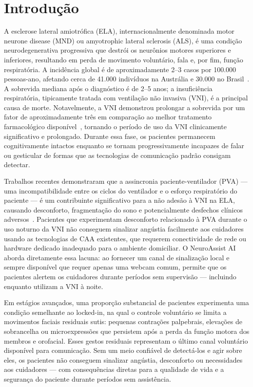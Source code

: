
\section{Introdução}
\label{sec:introducao}

A esclerose lateral amiotrófica (ELA), internacionalmente denominada motor neurone disease
(MND) ou amyotrophic lateral sclerosis (ALS), é uma condição neurodegenerativa progressiva que destrói os neurônios motores
superiores e inferiores, resultando em perda de movimento voluntário, fala e, por fim,
função respiratória. A incidência global é de aproximadamente 2--3 casos por
100.000 pessoas-ano, afetando cerca de 41.000 indivíduos na Austrália e 30.000 no
Brasil~\cite{mehta2018mnd}. A sobrevida mediana após o diagnóstico é de 2--5 anos; a
insuficiência respiratória, tipicamente tratada com ventilação não invasiva (VNI), é
a principal causa de morte. Notavelmente, a VNI demonstrou prolongar a sobrevida por
um fator de aproximadamente três em comparação ao melhor tratamento farmacológico
disponível~\cite{berlowitz2021niv}, tornando o período de uso da VNI clinicamente
significativo e prolongado. Durante essa fase, os pacientes permanecem cognitivamente
intactos enquanto se tornam progressivamente incapazes de falar ou gesticular de
formas que as tecnologias de comunicação padrão consigam detectar.

Trabalhos recentes demonstraram que a assincronia paciente-ventilador (PVA) — uma
incompatibilidade entre os ciclos do ventilador e o esforço respiratório do paciente
— é um contribuinte significativo para a não adesão à VNI na ELA, causando
desconforto, fragmentação do sono e potencialmente desfechos clínicos
adversos~\cite{atkeson2011pva, yang2026pva, berlowitz2025tla}. Pacientes que
experimentam desconforto relacionado à PVA durante o uso noturno da VNI não
conseguem sinalizar angústia facilmente aos cuidadores usando as tecnologias de CAA
existentes, que requerem conectividade de rede ou hardware dedicado inadequado para
o ambiente domiciliar. O NeuroAssist AI aborda diretamente essa lacuna: ao fornecer
um canal de sinalização local e sempre disponível que requer apenas uma webcam comum,
permite que os pacientes alertem os cuidadores durante períodos sem supervisão —
incluindo enquanto utilizam a VNI à noite.

Em estágios avançados, uma proporção substancial de pacientes experimenta uma condição
semelhante ao locked-in, na qual o controle voluntário se limita a movimentos faciais
residuais sutis: pequenas contrações palpebrais, elevações de sobrancelha ou
microexpressões que persistem após a perda da função motora dos membros e orofacial.
Esses gestos residuais representam o último canal voluntário disponível para
comunicação. Sem um meio confiável de detectá-los e agir sobre eles, os pacientes não
conseguem sinalizar angústia, desconforto ou necessidades aos cuidadores — com
consequências diretas para a qualidade de vida e a segurança do paciente durante
períodos sem assistência.

